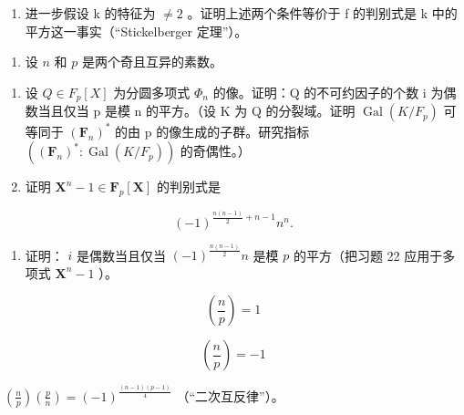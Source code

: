 \begin{enumerate}
\def\labelenumi{\alph{enumi})}
\setcounter{enumi}{1}
\tightlist
\item
  进一步假设 k 的特征为 \(\neq 2\) 。证明上述两个条件等价于 f 的判别式是 k 中的平方这一事实（“Stickelberger 定理”）。
\end{enumerate}

\begin{enumerate}
\def\labelenumi{\arabic{enumi})}
\setcounter{enumi}{22}
\tightlist
\item
  设 \(n\) 和 \(p\) 是两个奇且互异的素数。
\end{enumerate}

\begin{enumerate}
\def\labelenumi{\alph{enumi})}
\item
  设 \(Q \in F_{p}[X]\) 为分圆多项式 \(\Phi_{n}\) 的像。证明：Q 的不可约因子的个数 i 为偶数当且仅当 p 是模 n 的平方。（设 K 为 Q 的分裂域。证明 \(\operatorname{Gal}(K/F_{p})\) 可等同于 \((\mathbf{F}_{n})^{*}\) 的由 p 的像生成的子群。研究指标 \(((\mathbf{F}_{n})^{*}: \operatorname{Gal}(K/F_{p}))\) 的奇偶性。）
\item
  证明 \(\mathbf{X}^n - 1 \in \mathbf{F}_p[\mathbf{X}]\) 的判别式是
\end{enumerate}

\[
(- 1) ^ {\frac {n (n - 1)}{2} + n - 1} n ^ {n}.
\]

\begin{enumerate}
\def\labelenumi{\alph{enumi})}
\setcounter{enumi}{2}
\tightlist
\item
  证明： \(i\) 是偶数当且仅当 \((-1)^{\frac{n(n - 1)}{2}} n\) 是模 \(p\) 的平方（把习题 22 应用于多项式 \(\mathbf{X}^n - 1\) ）。
\end{enumerate}

\[
\left(\frac {n}{p}\right) = 1
\]

\[
\left(\frac {n}{p}\right) = - 1
\]

\(\left(\frac{n}{p}\right)\left(\frac{p}{n}\right) = (-1)^{\frac{(n - 1)(p - 1)}{4}}\) （“二次互反律”）。
\relax{}
